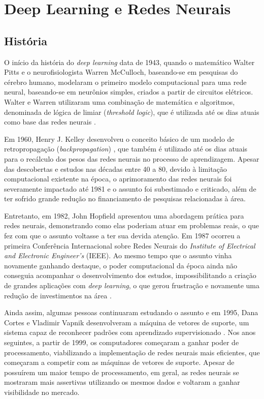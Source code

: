 \section{Deep Learning e Redes Neurais}

\subsection{História}
\indent
\par O início da história do \textit{deep learning} data de 1943, quando o matemático Walter Pitts e o neurofisiologista Warren McCulloch, baseando-se em pesquisas do cérebro humano, modelaram o primeiro modelo computacional para uma rede neural, baseando-se em neurônios simples, criados a partir de circuitos elétricos. Walter e Warren utilizaram uma combinação de matemática e algoritmos, denominada de lógica de limiar (\textit{threshold logic}), que é utilizada até os dias atuais como base das redes neurais \cite{Academy2019}.

\par Em 1960, Henry J. Kelley desenvolveu o conceito básico de um modelo de retropropagação (\textit{backpropagation}) \cite{Foote2019}, que também é utilizado até os dias atuais para o recálculo dos pesos das redes neurais no processo de aprendizagem. Apesar das descobertas e estudos nas décadas entre 40 a 80, devido à limitação computacional existente na época, o aprimoramento das redes neurais foi severamente impactado até 1981 e o assunto foi subestimado e criticado, além de ter sofrido grande redução no financiamento de pesquisas relacionadas à área.

\par Entretanto, em 1982, John Hopfield apresentou uma abordagem prática para redes neurais, demonstrando como elas poderiam atuar em problemas reais, o que fez com que o assunto voltasse a ter sua devida atenção. Em 1987 ocorreu a primeira Conferência Internacional sobre Redes Neurais do \textit{Institute of Electrical and Electronic Engineer’s} (IEEE). Ao mesmo tempo que o assunto vinha novamente ganhando destaque, o poder computacional da época ainda não conseguia acompanhar o desenvolvimento dos estudos, impossibilitando a criação de grandes aplicações com \textit{deep learning}, o que gerou frustração e novamente uma redução de investimentos na área \cite{Academy2019}.

\par Ainda assim, algumas pessoas continuaram estudando o assunto e em 1995, Dana Cortes e Vladimir Vapnik desenvolveram a máquina de vetores de suporte, um sistema capaz de reconhecer padrões com aprendizado supervisionado \cite{Foote2019}. Nos anos seguintes, a partir de 1999, os computadores começaram a ganhar poder de processamento, viabilizando a implementação de redes neurais mais eficientes, que começaram a competir com as máquinas de vetores de suporte. Apesar de possuírem um maior tempo de processamento, em geral, as redes neurais se mostraram mais assertivas utilizando os mesmos dados e voltaram a ganhar visibilidade no mercado.


